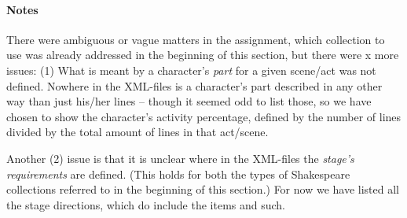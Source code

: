 \documentclass{article}
\begin{document}
\paragraph{Notes}
There were ambiguous or vague matters in the assignment, which
collection to use was already addressed in the beginning of this
section, but there were x more issues: (1) What is meant by a
character's \emph{part} for a given scene/act was not defined. Nowhere
in the XML-files is a character's part described in any other way than
just his/her lines -- though it seemed odd to list those, so we have
chosen to show the character's activity percentage, defined by the
number of lines divided by the total amount of lines in that act/scene.

Another (2) issue is that it is unclear where in the XML-files the
\emph{stage's requirements} are defined. (This holds for both the
types of Shakespeare collections referred to in the beginning of this
section.) For now we have listed all the stage directions, which do
include the items and such.
\end{document}
